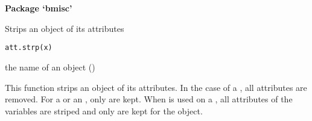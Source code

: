 \documentclass[a4paper]{book}
\begin{document}
\chapter*{}
\begin{center}
{\textbf{\huge Package `bmisc'}}
\par\bigskip{\large \today}
\end{center}
\begin{description}
\raggedright{}
\item[Type]
\item[Title]
\item[Version]
\item[Author]
\item[Maintainer]\AsIs{}
\item[Description]
\item[Depends]
\item[License]
\end{description}
\newpage
{}
%
\begin{Description}\relax
Strips an object of its attributes
\end{Description}
%
\begin{Usage}
\begin{verbatim}
att.strp(x)
\end{verbatim}
\end{Usage}
%
\begin{Arguments}
\begin{ldescription}
\item[\code{x}] the name of an object ()
\end{ldescription}
\end{Arguments}
%
\begin{Details}\relax
This function strips an object of its attributes. In the case of a , all attributes are removed. 
For a  or an , only  are kept. When  is used on a , 
all attributes of the variables are striped and only  are kept for the
 object.  


\end{Details}
\end{document}
